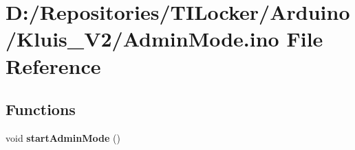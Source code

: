 \hypertarget{_admin_mode_8ino}{}\section{D\+:/\+Repositories/\+T\+I\+Locker/\+Arduino/\+Kluis\+\_\+\+V2/\+Admin\+Mode.ino File Reference}
\label{_admin_mode_8ino}
\subsection*{Functions}
\begin{DoxyCompactItemize}
\item 
\mbox{\label{_admin_mode_8ino_aa6f0cdd585025885e1dbf01d84b9005f}} 
void {\bfseries start\+Admin\+Mode} ()
\end{DoxyCompactItemize}
